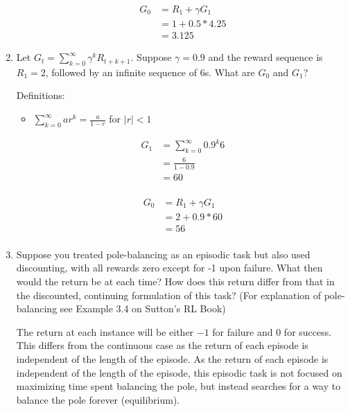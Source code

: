 \documentclass[11pt,onecolumn]{article}
\begin{document}
\begin{enumerate}
    \begin{equation}
        \begin{aligned}
            G_0 & = R_{1} + \gamma G_{1} \\ 
            & = 1 + 0.5 * 4.25 \\
            & = 3.125
        \end{aligned}
    \end{equation}
    \item Let $G_t = \sum_{k=0}^\infty \gamma^k R_{t+k+1}$. Suppose $\gamma = 0.9$ and the reward sequence is $R_1 =2$, followed by an infinite sequence of 6s. What are $G_0$ and $G_1$?
    \setlength{\parskip}{6pt}
    
    Definitions:
    \begin{itemize}
        \item $\sum_{k=0}^{\infty} ar^k = \frac{a}{1-r}$ for $\vert r \vert < 1$
    \end{itemize}
    \begin{equation}
        \begin{aligned}
        G_1 & = \sum_{k=0}^\infty 0.9^k6\\
        & = \frac{6}{1-0.9}\\
        & = 60\\ 
        \end{aligned}
    \end{equation}

    \begin{equation}
        \begin{aligned}
        G_0 & = R_{1} + \gamma G_{1} \\ 
        & = 2 + 0.9*60\\
        & = 56\\ 
        \end{aligned}
    \end{equation}
    \item Suppose you treated pole-balancing as an episodic task but also used discounting, with all rewards zero except for -1 upon failure. What then would the return be at each time? How does this return differ from that in the discounted, continuing formulation of this task? (For explanation of pole-balancing see Example 3.4 on Sutton's RL Book)
    \setlength{\parskip}{6pt}

    The return at each instance will be either $-1$ for failure and $0$ for success. This differs from the continuous case as the return of each episode is independent of the length of the episode. As the return of each episode is independent of the length of the episode, this episodic task is not focused on maximizing time spent balancing the pole, but instead searches for a way to balance the pole forever (equilibrium).
    

\end{enumerate}
\end{document}
